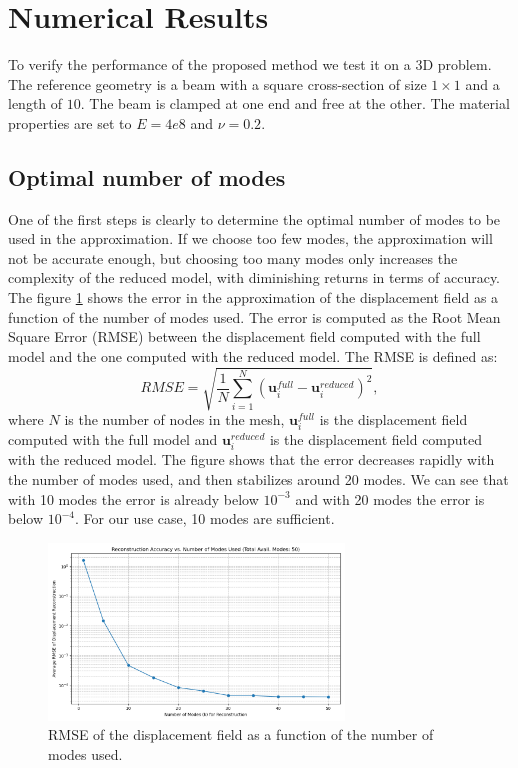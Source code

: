 \section{Numerical Results}
\label{sec:numerical_results}
To verify the performance of the proposed method we test it on a 3D problem. The reference geometry is a beam  with a square cross-section of size $1 \times 1$ and a length of $10$. The beam is clamped at one end and free at the other. The material properties are set to $E = 4e8$ and $\nu = 0.2$. 
\subsection{Optimal number of modes}
\label{sec:optimal_number_modes}
One of the first steps is clearly to determine the optimal number of modes to be used in the approximation. If we choose too few modes, the approximation will not be accurate enough, but choosing too many modes only increases the complexity of the reduced model, with diminishing returns in terms of accuracy. The figure \ref{fig:optimal_number_modes} shows the error in the approximation of the displacement field as a function of the number of modes used. The error is computed as the Root Mean Square Error (RMSE) between the displacement field computed with the full model and the one computed with the reduced model. The RMSE is defined as:
\begin{equation}
    RMSE = \sqrt{\frac{1}{N}\sum_{i=1}^N (\bm{u}_i^{full} - \bm{u}_i^{reduced})^2},
\end{equation}
where $N$ is the number of nodes in the mesh, $\bm{u}_i^{full}$ is the displacement field computed with the full model and $\bm{u}_i^{reduced}$ is the displacement field computed with the reduced model. The figure shows that the error decreases rapidly with the number of modes used, and then stabilizes around 20 modes. We can see that with 10 modes the error is already below \(10^{-3}\) and with 20 modes the error is below \(10^{-4}\). For our use case, 10 modes are sufficient.
\begin{figure}[H]
    \centering
    \includegraphics[width=0.7\textwidth]{Images/rmse_vs_modes.png}
    \caption{RMSE of the displacement field as a function of the number of modes used.}
    \label{fig:optimal_number_modes}
\end{figure}


